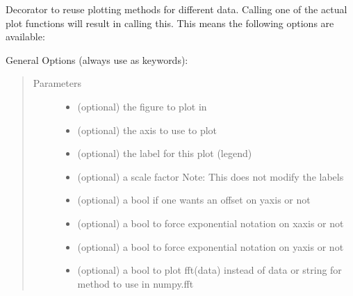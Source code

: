\documentclass[letterpaper,10pt,openany,oneside,english]{sphinxmanual}
\begin{document}
\begin{fulllineitems}
\begin{fulllineitems}
\begin{quote}
\begin{description}
\end{description}\end{quote}

\end{fulllineitems}


\begin{fulllineitems}
\label{\detokenize{plots:plots.SimplePlotter.plot}}
Decorator to reuse plotting methods for different data. Calling one of the actual plot  
functions will result in calling this.  
This means the following options are available:

General Options (always use as keywords):
\begin{quote}\begin{description}
\item[{Parameters}] \leavevmode\begin{itemize}
\item {} 
 \textendash{} (optional) the figure to plot in

\item {} 
 \textendash{} (optional) the axis to use to plot

\item {} 
 \textendash{} (optional) the label for this plot (legend)

\item {} 
 \textendash{} (optional) a scale factor Note: This does not modify the labels

\item {} 
 \textendash{} (optional) a bool if one wants an offset on yaxis or not

\item {} 
 \textendash{} (optional) a bool to force exponential notation on xaxis or not

\item {} 
 \textendash{} (optional) a bool to force exponential notation on yaxis or not

\item {} 
 \textendash{} (optional) a bool to plot fft(data) instead of data or string for method to  
use in numpy.fft


\end{itemize}
\end{description}
\end{quote}
\end{fulllineitems}
\end{fulllineitems}
\end{document}
